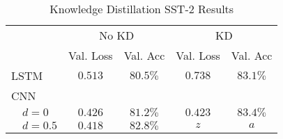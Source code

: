 \begin{table}[tbh]
        \caption{Knowledge Distillation SST-2 Results}
        \label{tab:kd_results}
        \centering
        \vspace{1em}
        \begin{tabular}{p{.1em}lcccc}
\toprule
& & \multicolumn{2}{c}{No KD} & \multicolumn{2}{c}{KD} \\
\cmidrule(lr){3-4} \cmidrule(lr){5-6}
& & Val. Loss & Val. Acc & Val. Loss & Val. Acc \\
\cmidrule{3-6}
\multicolumn{2}{l}{LSTM} & $0.513$ & $80.5\%$ & $0.738$ & $83.1\%$ \\[\tableblocksep]
\multicolumn{2}{l}{CNN}  \\
& $d=0$ & $0.426$ & $81.2\%$ & $0.423$ & $83.4\%$ \\
& $d=0.5$ & $0.418$ & $82.8\%$ & $z$ & $a$ \\
\bottomrule
\end{tabular}

\end{table}
